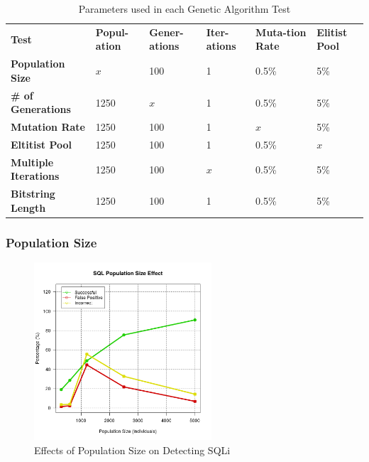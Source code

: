 \begin{table}[h]
	\centering
	\begin{tabular}{|p{1.5in}|p{0.675in}|p{0.675in}|p{0.675in}|p{0.675in}|p{0.675in}|}
	\hline
	\textbf{Test} & \textbf{Popul-ation} & \textbf{Gener-ations} & \textbf{Iter-ations} & \textbf{Muta-tion Rate} & \textbf{Elitist Pool} \\ 
	\hhline{|=|=|=|=|=|=|}
	\textbf{Population Size} & \textbf{$x$} & 100 & 1 & 0.5\% & 5\% \\
	\hline
	\textbf{\# of Generations} & 1250 & \textbf{$x$} & 1 & 0.5\% & 5\% \\
	\hline
	\textbf{Mutation Rate} & 1250 & 100 & 1 & \textbf{$x$} & 5\% \\
	\hline
	\textbf{Eltitist Pool} & 1250 & 100 & 1 & 0.5\% & \textbf{$x$} \\
	\hline
	\textbf{Multiple Iterations} & 1250 & 100 & \textbf{$x$} & 0.5\% & 5\% \\
	\hline
	\textbf{Bitstring Length} & 1250 & 100 & 1 & 0.5\% & 5\% \\
	\hline
	\end{tabular}
	\caption{Parameters used in each Genetic Algorithm Test}
	\label{tab:gaTestParameters}
\end{table}

\subsubsection{Population Size}

\begin{figure}
	\includegraphics[width=250px]{./assets/results/ga/pop/Results_SQL.png}
	\caption{Effects of Population Size on Detecting SQLi}
	\label{fig:resPopSize}
\end{figure}

